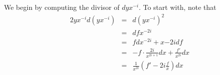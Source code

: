 \documentclass[draft, 11pt]{article} %
\theoremstyle{plain}
\theoremstyle{remark}
\DeclareMathOperator{\di}{div}
\begin{document}
\begin{comment}
We can, of course, rewrite $d(yx^{-i})$ as $ydx^{-i} + x^{-i}dy$.
We will start by studying these two divisors, and use them to find an appropriate $\omega_1$ and $\omega_2$.

We first consider $x^{-i}dy$.
Now $ dy = \frac{f'}{y}dx$, so \begin{eqnarray*} \di (dy) & = & \di(f') - \di (y) + \di (dx) \\ & = & \di(f') - (R - (2g+2)[P_\infty]) + (R - 4[P_\infty])\\  & = & \di(f') +(2g-2)[P_\infty].\end{eqnarray*}
Note that we use the Hurwitz formula to compute the divisor of $dx$.
So \begin{eqnarray} \di(x^{-i}dy) & = &  \di(f') -2i[P_0] + (2i +2g-2)P_{\infty} \\ & = & \di_0(f') - 2i[P_0] + (2i-2)[P_\infty]. \end{eqnarray}

We now consider $ydx^{-i}$.
Firstly, \[ y dx^{-i} = y\cdot \frac{i}{x^{i-1}}d\frac{1}{x} = y \cdot \frac{i}{x^{i+1}} dx.\]
Hence \begin{eqnarray*} \di (ydx^{-i}) & = & (R - (2g+2)[P_\infty]) -(2(i+1)[P_0] - 2(i+1)[P_\infty]) + (R - 4[P_\infty]) \\ & = &  2R - 2(i+1)[P_0] + 2(i-g-2)[P_\infty] \\ & = & 2\left ( \sum_{\text{Ramified } P\neq P_0, P_\infty}[P]\right) - 2i[P_0] +2(i-g-1)P_\infty .\end{eqnarray*}
\end{comment}

We begin by computing the divisor of $dyx^{-i}$.
To start with, note that 
\begin{eqnarray*}
2yx^{-i}d(yx^{-i}) & = & d(yx^{-i})^2 \\
& = & dfx^{-2i} \\
& = & fdx^{-2i} + x{-2i}df \\
& = & -f\cdot\frac{2i}{x^{2i+1}}dx + \frac{f'}{x^{2i}}dx \\
& = & \frac{1}{x^{2i}}\left( f' - 2i\frac{f}{x}\right) dx 
\end{eqnarray*}
\end{document}
